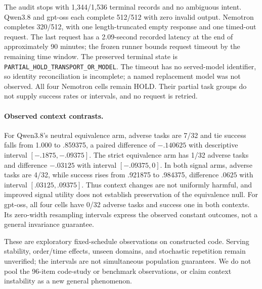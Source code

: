 \documentclass[10pt]{article}
\begin{document}
The audit stops with 1,344/1,536 terminal records and no ambiguous intent. Qwen3.8 and gpt-oss each complete 512/512 with zero invalid output. Nemotron completes 320/512, with one length-truncated empty response and one timed-out request. The last request has a 2.09-second recorded latency at the end of approximately 90 minutes; the frozen runner bounds request timeout by the remaining time window. The preserved terminal state is \texttt{PARTIAL\_HOLD\_TRANSPORT\_OR\_MODEL}. The timeout has no served-model identifier, so identity reconciliation is incomplete; a named replacement model was not observed. All four Nemotron cells remain HOLD. Their partial task groups do not supply success rates or intervals, and no request is retried.



\paragraph{Observed context contrasts.}
For Qwen3.8's neutral equivalence arm, adverse tasks are 7/32 and tie success falls from 1.000 to .859375, a paired difference of $-.140625$ with descriptive interval $[-.1875,-.09375]$. The strict equivalence arm has 1/32 adverse tasks and difference $-.03125$ with interval $[-.09375,0]$. In both signal arms, adverse tasks are 4/32, while success rises from .921875 to .984375, difference $.0625$ with interval $[.03125,.09375]$. Thus context changes are not uniformly harmful, and improved signal utility does not establish preservation of the equivalence null. For gpt-oss, all four cells have 0/32 adverse tasks and success one in both contexts. Its zero-width resampling intervals express the observed constant outcomes, not a general invariance guarantee.

These are exploratory fixed-schedule observations on constructed code. Serving stability, order/time effects, unseen domains, and stochastic repetition remain unverified; the intervals are not simultaneous population guarantees. We do not pool the 96-item code-study or benchmark observations, or claim context instability as a new general phenomenon.
\end{document}
